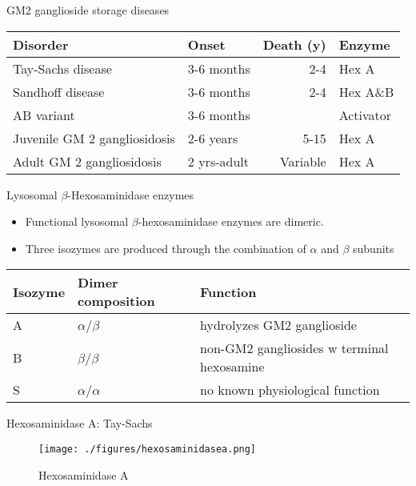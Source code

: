 \documentclass[presentation, smaller]{beamer}
\begin{document}
\begin{frame}[label={sec:orgheadline6}]{GM2 ganglioside storage diseases}
\begin{center}
\begin{tabular}{llrl}
Disorder & Onset & Death (y) & Enzyme\\
\hline
Tay-Sachs disease & 3-6 months & 2-4 & Hex A\\
Sandhoff disease & 3-6 months & 2-4 & Hex A\&B\\
AB variant & 3-6 months &  & Activator\\
Juvenile GM 2 gangliosidosis & 2-6 years & 5-15 & Hex A\\
Adult GM 2 gangliosidosis & 2 yrs-adult & Variable & Hex A\\
\end{tabular}
\end{center}
\end{frame}


\begin{frame}[label={sec:orgheadline7}]{Lysosomal \(\beta\)-Hexosaminidase enzymes}
\begin{itemize}
\item Functional lysosomal \(\beta\)-hexosaminidase enzymes are dimeric.
\item Three isozymes are produced through the combination of \(\alpha\)
  and \(\beta\) subunits
\end{itemize}

\begin{center}
\begin{tabular}{lll}
Isozyme & Dimer composition & Function\\
\hline
A & \(\alpha\)/\(\beta\) & hydrolyzes GM2 ganglioside\\
B & \(\beta\)/\(\beta\) & non-GM2 gangliosides w terminal hexosamine\\
S & \(\alpha\)/\(\alpha\) & no known physiological function\\
\end{tabular}
\end{center}
\end{frame}



\begin{frame}[label={sec:orgheadline8}]{Hexosaminidase A: Tay-Sachs}
\begin{figure}[htb]
\centering
\texttt{[image: ./figures/hexosaminidasea.png]}
\caption[hexa]{\label{fig:hexa}
Hexosaminidase A}
\end{figure}
\end{frame}
\end{document}
